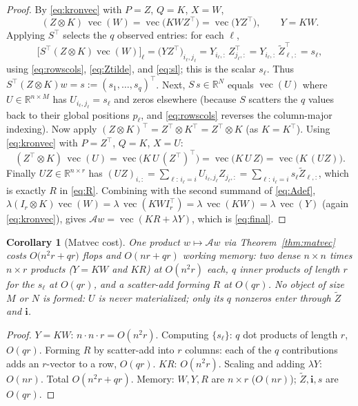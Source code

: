 \documentclass[12pt]{article}
\DeclareMathOperator{\vecop}{vec}
\newcommand{\bR}{\mathbb{R}}
\newtheorem{corollary}{Corollary}
\begin{document}
\begin{proof}
By \eqref{eq:kronvec} with $P=Z$, $Q=K$, $X=W$,
\begin{equation}\label{eq:step1}
  (Z\otimes K)\,\vecop(W)=\vecop\!\big(KWZ^{\!\top}\big)=\vecop\!\big(YZ^{\!\top}\big),
  \qquad Y=KW.
\end{equation}
Applying $S^{\!\top}$ selects the $q$ observed entries: for each $\ell$,
\[
  \big[S^{\!\top}(Z\otimes K)\vecop(W)\big]_\ell
  =\big(YZ^{\!\top}\big)_{i_\ell,j_\ell}
  =Y_{i_\ell,:}\,Z_{j_\ell,:}^{\!\top}
  =Y_{i_\ell,:}\,\widetilde Z_{\ell,:}^{\!\top}=s_\ell,
\]
using \eqref{eq:rowscols}, \eqref{eq:Ztilde}, and \eqref{eq:sl}; this is the
scalar $s_\ell$. Thus $S^{\!\top}(Z\otimes K)w=s:=(s_1,\dots,s_q)^{\!\top}$.
Next, $S\,s\in\bR^N$ equals $\vecop(U)$ where $U\in\bR^{n\times M}$ has
$U_{i_\ell,j_\ell}=s_\ell$ and zeros elsewhere (because $S$ scatters the $q$
values back to their global positions $p_\ell$, and \eqref{eq:rowscols} reverses
the column-major indexing). Now apply $(Z\otimes K)^{\!\top}=Z^{\!\top}\otimes
K^{\!\top}=Z^{\!\top}\otimes K$ (as $K=K^{\!\top}$). Using \eqref{eq:kronvec}
with $P=Z^{\!\top}$, $Q=K$, $X=U$:
\[
  (Z^{\!\top}\otimes K)\,\vecop(U)
  =\vecop\!\big(K\,U\,(Z^{\!\top})^{\!\top}\big)
  =\vecop\!\big(K\,U\,Z\big)
  =\vecop\!\big(K\,(UZ)\big).
\]
Finally $UZ\in\bR^{n\times r}$ has $(UZ)_{i,:}=\sum_{\ell:\,i_\ell=i}
U_{i_\ell,j_\ell}Z_{j_\ell,:}=\sum_{\ell:\,i_\ell=i}s_\ell\widetilde Z_{\ell,:}$,
which is exactly $R$ in \eqref{eq:R}. Combining with the second summand of
\eqref{eq:Adef},
$\lambda(I_r\otimes K)\vecop(W)=\lambda\,\vecop(KW I_r^{\!\top})=
\lambda\,\vecop(KW)=\lambda\,\vecop(Y)$ (again \eqref{eq:kronvec}), gives
$\mathcal{A}w=\vecop(KR+\lambda Y)$, which is \eqref{eq:final}.
\end{proof}

\begin{corollary}[Matvec cost]\label{cor:matveccost}
One product $w\mapsto\mathcal{A}w$ via Theorem~\ref{thm:matvec} costs
$O\!\big(n^2r+qr\big)$ flops and $O(nr+qr)$ working memory: two
dense $n\times n$ times $n\times r$ products ($Y=KW$ and $KR$) at $O(n^2r)$ each,
$q$ inner products of length $r$ for the $s_\ell$ at $O(qr)$, and a scatter-add
forming $R$ at $O(qr)$. No object of size $M$ or $N$ is formed: $U$ is never
materialized; only its $q$ nonzeros enter through $\widetilde Z$ and $\mathbf{i}$.
\end{corollary}

\begin{proof}
$Y=KW$: $n\cdot n\cdot r=O(n^2r)$. Computing $\{s_\ell\}$: $q$ dot products of
length $r$, $O(qr)$. Forming $R$ by scatter-add into $r$ columns: each of the
$q$ contributions adds an $r$-vector to a row, $O(qr)$. $KR$: $O(n^2r)$. Scaling
and adding $\lambda Y$: $O(nr)$. Total $O(n^2r+qr)$. Memory: $W,Y,R$ are
$n\times r$ ($O(nr)$); $\widetilde Z,\mathbf{i},s$ are $O(qr)$.
\end{proof}
\end{document}
